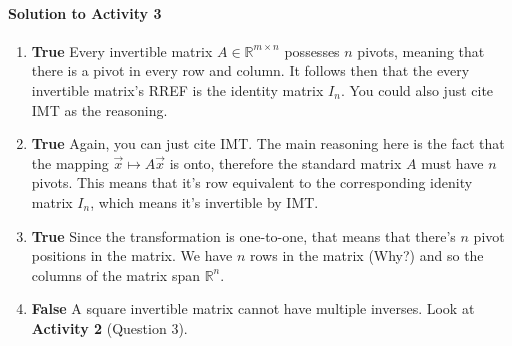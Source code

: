 \paragraph{Solution to Activity 3}
\begin{enumerate}
	\item \textbf{True} Every invertible matrix \(A \in \mathbb{R}^{m \times n}\) possesses \(n\) pivots, meaning that there is a pivot in every row and column. It follows
		then that the every invertible matrix's RREF is the identity matrix \(I_n\). You could also just cite IMT as the reasoning.
	\item \textbf{True} Again, you can just cite IMT. The main reasoning here is the fact that the mapping \(\vec{x} \mapsto A\vec{x}\) is onto, therefore the standard
		matrix \(A\) must have \(n\) pivots. This means that it's row equivalent to the corresponding idenity matrix \(I_n\), which means it's invertible by IMT.
	\item \textbf{True} Since the transformation is one-to-one, that means that there's \(n\) pivot positions in the matrix. We have \(n\) rows in the matrix (Why?) and
		so the columns of the matrix span \(\mathbb{R}^n\).
	\item \textbf{False} A square invertible matrix cannot have multiple inverses. Look at \textbf{Activity 2} (Question 3).
\end{enumerate}

